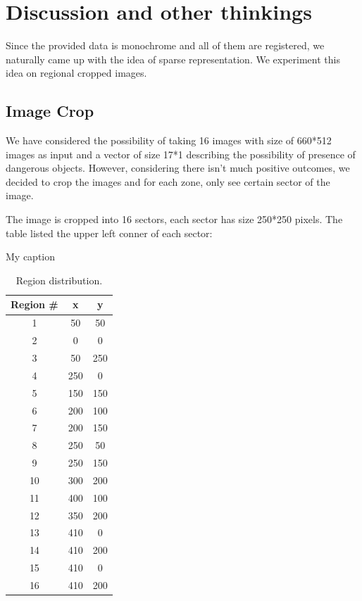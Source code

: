 \documentclass[conference,compsoc]{IEEEtran}
\begin{document}
\section{Discussion and other thinkings}
Since the provided data is monochrome and all of them are registered, we naturally came up with the idea of sparse representation. We experiment this idea on regional cropped images.

\subsection{Image Crop}
We have considered the possibility of taking 16 images with size of 660*512 images as input and a vector of size 17*1 describing the possibility of presence of dangerous objects. However, considering there isn't much positive outcomes, we decided to crop the images and for each zone, only see certain sector of the image.

The image is cropped into 16 sectors, each sector has size 250*250 pixels. The table listed the upper left conner of each sector:
\begin{table}[!htb]
    \centering
    \caption{My caption}
    \label{my-label}
    \begin{tabular}{ccc}
        \hline
        Region \# & x   & y   \\ \hline
        1         & 50  & 50  \\ \hline
        2         & 0   & 0   \\ \hline
        3         & 50  & 250 \\ \hline
        4         & 250 & 0   \\ \hline
        5         & 150 & 150 \\ \hline
        6         & 200 & 100 \\ \hline
        7         & 200 & 150 \\ \hline
        8         & 250 & 50  \\ \hline
        9         & 250 & 150 \\ \hline
        10        & 300 & 200 \\ \hline
        11        & 400 & 100 \\ \hline
        12        & 350 & 200 \\ \hline
        13        & 410 & 0   \\ \hline
        14        & 410 & 200 \\ \hline
        15        & 410 & 0   \\ \hline
        16        & 410 & 200 \\ \hline
    \end{tabular}
    \caption{Region distribution.}
\end{table}
\end{document}

